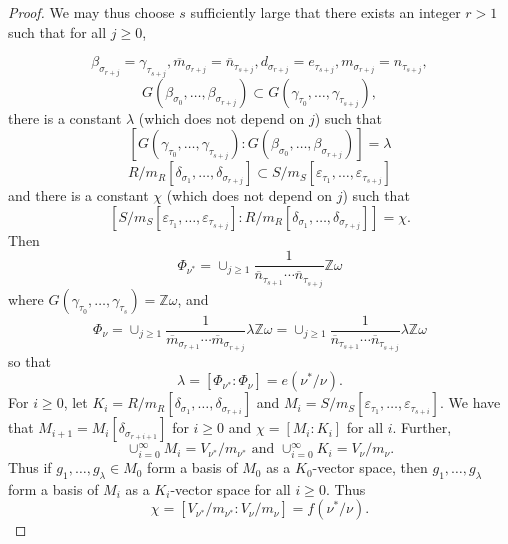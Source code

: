 \documentclass[11pt]{amsart}
\def\NZQ{\mathbb}               %
\def\ZZ{{\NZQ Z}}
\let\epsilon\varepsilon
\begin{document}
\begin{proof}
We may thus choose $s$ sufficiently large that there exists an integer $r>1$ such that for all $j\ge 0$,

$$
\beta_{\sigma_{r+j}}=\gamma_{\tau_{s+j}},
\overline m_{\sigma_{r+j}}=\overline n_{\tau_{s+j}},
d_{\sigma_{r+j}}=e_{\tau_{s+j}},
m_{\sigma_{r+j}}=n_{\tau_{s+j}},
$$
$$
G(\beta_{\sigma_0},\ldots,\beta_{\sigma_{r+j}})\subset G(\gamma_{\tau_0},\ldots,\gamma_{\tau_{s+j}}),
$$ 
there is a constant $\lambda$ (which does not depend on $j$) such that 
$$
 [G(\gamma_{\tau_0},\ldots,\gamma_{\tau_{s+j}}):G(\beta_{\sigma_0},\ldots,\beta_{\sigma_{r+j}})]=\lambda
 $$
$$
R/m_R[\delta_{\sigma_1},\ldots,\delta_{\sigma_{r+j}}]\subset S/m_S[\epsilon_{\tau_1},\ldots,\epsilon_{\tau_{s+j}}]
$$
and there is a constant $\chi$ (which does not depend on $j$) such that 
$$
[S/m_S[\epsilon_{\tau_1},\ldots,\epsilon_{\tau_{s+j}}]:R/m_R[\delta_{\sigma_1},\ldots,\delta_{\sigma_{r+j}}]]=\chi.
$$
Then
$$
\Phi_{\nu^*}=\cup_{j\ge 1}\frac{1}{\overline n_{\tau_{s+1}}\cdots\overline n_{\tau_{s+j}}}\ZZ\omega
$$
where $G(\gamma_{\tau_0},\ldots,\gamma_{\tau_s})=\ZZ\omega$,
and 
$$
\Phi_{\nu}=\cup_{j\ge 1}\frac{1}{\overline m_{\sigma_{r+1}}\cdots\overline m_{\sigma_{r+j}}}\lambda\ZZ\omega= \cup_{j\ge 1}\frac{1}{\overline n_{\tau_{s+1}}\cdots\overline n_{\tau_{s+j}}}\lambda\ZZ\omega
$$
so that
$$
\lambda=[\Phi_{\nu^*}:\Phi_{\nu}]=e(\nu^*/\nu).
$$
For $i\ge 0$, let $K_i=R/m_R[\delta_{\sigma_1},\ldots,\delta_{\sigma_{r+i}}]$ and $M_i=S/m_S[\epsilon_{\tau_1},\ldots,\epsilon_{\tau_{s+i}}]$.
We have that $M_{i+1}=M_i[\delta_{\sigma_{r+i+1}}]$ for $i\ge 0$ and $\chi=[M_i:K_i]$ for all $i$. Further,
$$
\cup_{i=0}^{\infty}M_i=V_{\nu^*}/m_{\nu^*}\mbox{ and }\cup_{i=0}^{\infty}K_i=V_{\nu}/m_{\nu}.
$$
 Thus if $g_1,\ldots,g_{\lambda}\in M_0$ form a basis of $M_0$ as a $K_0$-vector space, then $g_1,\ldots,g_{\lambda}$ form a basis of $M_i$ as a $K_i$-vector space for all $i\ge 0$. Thus
$$
\chi=[V_{\nu^*}/m_{\nu^*}:V_{\nu}/m_{\nu}]=f(\nu^*/\nu).
$$
\end{proof}
\end{document}
